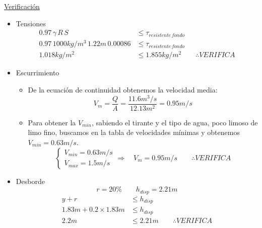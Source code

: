 \underline{Verificación}

\begin{itemize}
 \item Tensiones
    \begin{align*}
    0.97 \, \gamma \, R \, S &\leq \tau_{resistente\,fondo} \\
    0.97 \, 1000 kg/m^3 \, 1.22 m \, 0.00086 &\leq \tau_{resistente\,fondo} \\
    1.018 kg/m^2 &\leq 1.855 kg/m^2
    \qquad
    \therefore VERIFICA 
    \end{align*}

 \item Escurrimiento
    \begin{itemize}
    \item De la ecuación de continuidad obtenemos la velocidad media:
	\begin{equation*}
	V_{m} = \dfrac{Q}{A} = \dfrac{11.6 m^3/s}{12.13 m^2} = 0.95 m/s
	\end{equation*}
    \item Para obtener la $V_{min}$, sabiendo el tirante y el tipo de agua, poco limoso de limo fino, buscamos en
    la tabla de velocidades mínimas y obtenemos $V_{min} = 0.63 m/s$.
	\begin{equation*}
	  \begin{cases}
	  V_{min} = 0.63 m/s \\
	  V_{max} = 1.5 m/s
	  \end{cases}
	  \Longrightarrow \quad
	  V_{m} = 0.95 m/s
	  \qquad
	  \therefore VERIFICA
	\end{equation*}
    \end{itemize}

 \item Desborde
    \begin{equation*}
    r = 20\%
    \qquad
    h_{disp} = 2.21 m
    \end{equation*}
    \begin{align*}
    y + r &\leq h_{disp} \\
    1.83 m + 0.2 \times 1.83 m &\leq h_{disp} \\
    2.2 m &\leq 2.21 m
    \qquad
    \therefore VERIFICA
    \end{align*}
\end{itemize}

